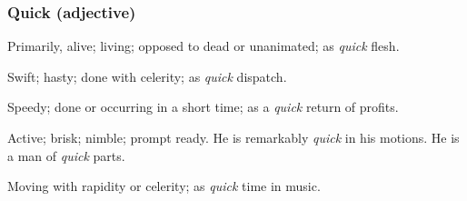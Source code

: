 	\subsubsection{Quick (adjective)}
	
		\begin{compactitem}
			\item[1] Primarily, alive; living; opposed to dead or unanimated; as \textit{quick} flesh.
			\item[2] Swift; hasty; done with celerity; as \textit{quick} dispatch.
			\item[3] Speedy; done or occurring in a short time; as a \textit{quick} return of profits.
			\item[4] Active; brisk; nimble; prompt ready. He is remarkably \textit{quick} in his motions. He is a man of \textit{quick} parts.
			\item[5] Moving with rapidity or celerity; as \textit{quick} time in music.
		\end{compactitem}


	

	


